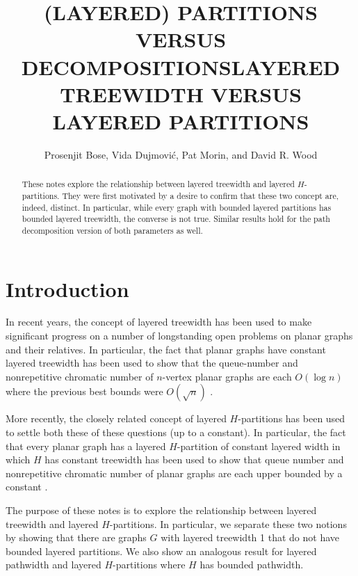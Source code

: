 \documentclass[kpfonts]{patmorin}
\title{\MakeUppercase{(Layered) Partitions versus Decompositions}}
\author{}
\title{\MakeUppercase{Layered Treewidth versus Layered Partitions}}
\author{Prosenjit Bose, Vida Dujmović, Pat Morin, and David R. Wood}
\begin{document}
\begin{titlepage}
\maketitle

\begin{abstract}
  These notes explore the relationship between layered treewidth and layered $H$-partitions.  They were first motivated by a desire to confirm that these two concept are, indeed, distinct.  In particular, while every graph with bounded layered partitions has bounded layered treewidth, the converse is not true.  Similar results hold for the path decomposition version of both parameters as well.
\end{abstract}
\end{titlepage}

\tableofcontents

\newpage
{}

\section{Introduction}

In recent years, the concept of layered treewidth has been used to make significant progress on a number of longstanding open problems on planar graphs and their relatives.  In particular, the fact that planar graphs have constant layered treewidth has been used to show that the queue-number and nonrepetitive chromatic number of $n$-vertex planar graphs are each $O(\log n)$ where the previous best bounds were $O(\sqrt{n})$ \cite{dujmovic:graph,dujmovic.joret.ea:nonrepetitive}.

More recently, the closely related concept of layered $H$-partitions has been used to settle both these of these questions (up to a constant).  In particular, the fact that every planar graph has a layered $H$-partition of constant layered width in which $H$ has constant treewidth has been used to show that queue number and nonrepetitive chromatic number of planar graphs are each upper bounded by a constant \cite{dujmovic.esperet.ea:planar,dujmovic.joret.ea:planar}.

The purpose of these notes is to explore the relationship between layered treewidth and layered $H$-partitions.  In particular, we separate these two notions by showing that there are graphs $G$ with layered treewidth 1 that do not have bounded layered partitions.  We also show an analogous result for layered pathwidth and layered $H$-partitions where $H$ has bounded pathwidth.
\end{document}
